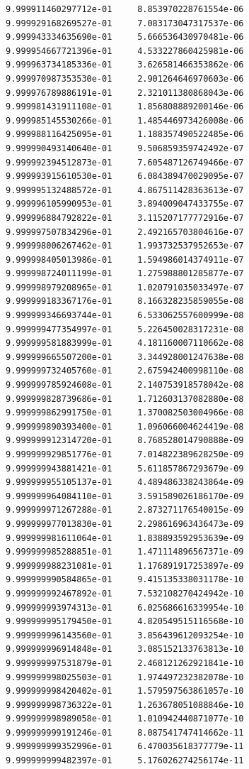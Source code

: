 \documentclass[a4paper,12pt]{article}
\begin{document}
\begin{enumerate}[label = \arabic*.]
\begin{enumerate}[label = \roman*.]
\begin{verbatim}
9.999911460297712e-01     8.853970228761554e-06
9.999929168269527e-01     7.083173047317537e-06
9.999943334635690e-01     5.666536430970481e-06
9.999954667721396e-01     4.533227860425981e-06
9.999963734185336e-01     3.626581466353862e-06
9.999970987353530e-01     2.901264646970603e-06
9.999976789886191e-01     2.321011380868043e-06
9.999981431911108e-01     1.856808889200146e-06
9.999985145530266e-01     1.485446973426008e-06
9.999988116425095e-01     1.188357490522485e-06
9.999990493140640e-01     9.506859359742492e-07
9.999992394512873e-01     7.605487126749466e-07
9.999993915610530e-01     6.084389470029095e-07
9.999995132488572e-01     4.867511428363613e-07
9.999996105990953e-01     3.894009047433755e-07
9.999996884792822e-01     3.115207177772916e-07
9.999997507834296e-01     2.492165703804616e-07
9.999998006267462e-01     1.993732537952653e-07
9.999998405013986e-01     1.594986014374911e-07
9.999998724011199e-01     1.275988801285877e-07
9.999998979208965e-01     1.020791035033497e-07
9.999999183367176e-01     8.166328235859055e-08
9.999999346693744e-01     6.533062557600999e-08
9.999999477354997e-01     5.226450028317231e-08
9.999999581883999e-01     4.181160007110662e-08
9.999999665507200e-01     3.344928001247638e-08
9.999999732405760e-01     2.675942400998110e-08
9.999999785924608e-01     2.140753918578042e-08
9.999999828739686e-01     1.712603137082880e-08
9.999999862991750e-01     1.370082503004966e-08
9.999999890393400e-01     1.096066004624419e-08
9.999999912314720e-01     8.768528014790888e-09
9.999999929851776e-01     7.014822389628250e-09
9.999999943881421e-01     5.611857867293679e-09
9.999999955105137e-01     4.489486338243864e-09
9.999999964084110e-01     3.591589026186170e-09
9.999999971267288e-01     2.873271176540015e-09
9.999999977013830e-01     2.298616963436473e-09
9.999999981611064e-01     1.838893592953639e-09
9.999999985288851e-01     1.471114896567371e-09
9.999999988231081e-01     1.176891917253897e-09
9.999999990584865e-01     9.415135338031178e-10
9.999999992467892e-01     7.532108270424942e-10
9.999999993974313e-01     6.025686616339954e-10
9.999999995179450e-01     4.820549515116568e-10
9.999999996143560e-01     3.856439612093254e-10
9.999999996914848e-01     3.085152133763813e-10
9.999999997531879e-01     2.468121262921841e-10
9.999999998025503e-01     1.974497232382078e-10
9.999999998420402e-01     1.579597563861057e-10
9.999999998736322e-01     1.263678051088846e-10
9.999999998989058e-01     1.010942440871077e-10
9.999999999191246e-01     8.087541747414662e-11
9.999999999352996e-01     6.470035618377779e-11
9.999999999482397e-01     5.176026274256174e-11

\end{verbatim}
\end{enumerate}
\end{enumerate}
\end{document}
